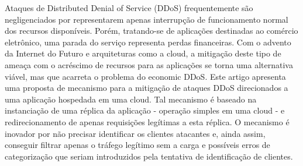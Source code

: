 
Ataques de Distributed Denial of Service (DDoS) frequentemente são negligenciados por representarem apenas interrupção de funcionamento normal dos recursos disponíveis. Porém, tratando-se de aplicações destinadas ao comércio eletrônico, uma parada do serviço representa perdas financeiras. Com o advento da Internet do Futuro e arquiteturas como a cloud, a mitigação deste tipo de ameaça com o acréscimo de recursos para as aplicações se torna uma alternativa viável, mas que acarreta o problema do economic DDoS. Este artigo apresenta uma proposta de mecanismo para a mitigação de ataques DDoS direcionados a uma aplicação hospedada em uma cloud. Tal mecanismo é baseado na instanciação de uma réplica da aplicação - operação simples em uma cloud - e redirecionamento de apenas requisições legítimas a esta réplica. O mecanismo é inovador por não precisar identificar os clientes atacantes e, ainda assim, conseguir filtrar apenas o tráfego legítimo sem a carga e possíveis erros de categorização que seriam introduzidos pela tentativa de identificação de clientes.
